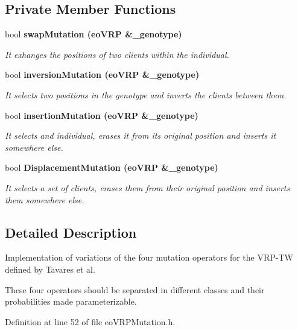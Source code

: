 \subsection*{Private Member Functions}
\begin{CompactItemize}
\item 
bool \bf{swap\-Mutation} (\bf{eo\-VRP} \&\_\-genotype)
\begin{CompactList}\small\item\em It exhanges the positions of two clients within the individual. \item\end{CompactList}\item 
bool \bf{inversion\-Mutation} (\bf{eo\-VRP} \&\_\-genotype)
\begin{CompactList}\small\item\em It selects two positions in the genotype and inverts the clients between them. \item\end{CompactList}\item 
bool \bf{insertion\-Mutation} (\bf{eo\-VRP} \&\_\-genotype)
\begin{CompactList}\small\item\em It selects and individual, erases it from its original position and inserts it somewhere else. \item\end{CompactList}\item 
bool \bf{Displacement\-Mutation} (\bf{eo\-VRP} \&\_\-genotype)
\begin{CompactList}\small\item\em It selects a set of clients, erases them from their original position and inserts them somewhere else. \item\end{CompactList}\end{CompactItemize}


\subsection{Detailed Description}
Implementation of variations of the four mutation operators for the VRP-TW defined by Tavares et al. 

These four operators should be separated in different classes and their probabilities made parameterizable. 



Definition at line 52 of file eo\-VRPMutation.h.

